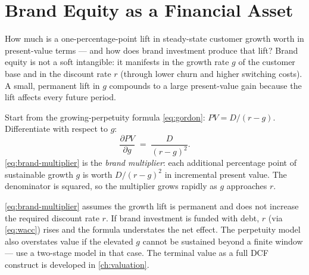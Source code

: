 \section{Brand Equity as a Financial Asset}\label{sec:brand-multiplier}

How much is a one-percentage-point lift in steady-state customer growth worth in present-value terms --- and how does brand investment produce that lift? Brand equity is not a soft intangible: it manifests in the growth rate \(g\) of the customer base and in the discount rate \(r\) (through lower churn and higher switching costs). A small, permanent lift in \(g\) compounds to a large present-value gain because the lift affects every future period.

Start from the growing-perpetuity formula \cref{eq:gordon}: \(PV = D/(r-g)\). Differentiate with respect to \(g\):
\begin{equation}\label{eq:brand-multiplier}
  \frac{\partial PV}{\partial g} \;=\; \frac{D}{(r-g)^{2}} .
\end{equation}
\cref{eq:brand-multiplier} is the \emph{brand multiplier}: each additional percentage point of sustainable growth \(g\) is worth \(D/(r-g)^2\) in incremental present value. The denominator is squared, so the multiplier grows rapidly as \(g\) approaches \(r\).

\cref{eq:brand-multiplier} assumes the growth lift is permanent and does not increase the required discount rate \(r\). If brand investment is funded with debt, \(r\) (via \cref{eq:wacc}) rises and the formula understates the net effect. The perpetuity model also overstates value if the elevated \(g\) cannot be sustained beyond a finite window --- use a two-stage model in that case. The terminal value as a full DCF construct is developed in \cref{ch:valuation}.

